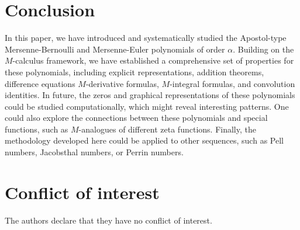 \documentclass[12pt, a4paper]{article}
\theoremstyle{definition}
\numberwithin{equation}{section}
\begin{document}
\section{Conclusion}

In this paper, we have introduced and systematically studied the Apostol-type Mersenne-Bernoulli and Mersenne-Euler polynomials of order $\alpha$. Building on the $M$-calculus framework, we have established a comprehensive set of properties for these polynomials, including explicit representations, addition theorems, difference equations $M$-derivative formulas, $M$-integral formulas, and convolution identities. In future, the zeros and graphical representations of these polynomials could be studied computationally, which might reveal interesting patterns. One could also explore the connections between these polynomials and special functions, such as $M$-analogues of different zeta functions. Finally, the methodology developed here could be applied to other sequences, such as Pell numbers, Jacobsthal numbers, or Perrin numbers.

\section*{Conflict of interest}
The authors declare that they have no conflict of interest.
\end{document}

